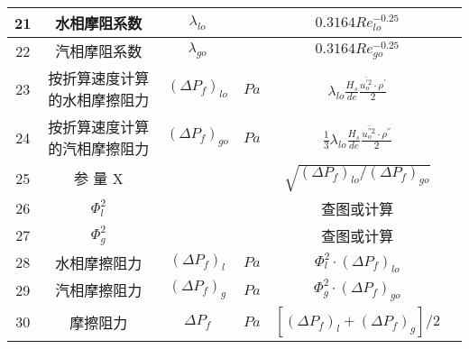 \begin{table}[H]
{\begin{tabular}{|c|c|c|c|c|c|}
            21   & 水相摩阻系数                 & $ \lambda_{lo} $          &            & $ 0.3164Re_{lo}^{-0.25} $                                                                     &      \\ \hline
            22   & 汽相摩阻系数                 & $ \lambda_{go} $          &            & $ 0.3164Re_{go}^{-0.25} $                                                                     &      \\ \hline
            23   & 按折算速度计算的水相摩擦阻力 & $ (\Delta P_f)_{lo} $     & $ Pa $     & $ \lambda_{lo} \frac{H_s}{de} \frac{\overline{u_{o}^{'2}} \cdot  \rho^{'}}{2} $               &      \\ \hline
            24   & 按折算速度计算的汽相摩擦阻力 & $ (\Delta P_f)_{go} $     & $ Pa $     & $ \frac{1}{3} \lambda_{lo} \frac{H_s}{de} \frac{\overline{u_{o}^{''2}} \cdot  \rho^{''}}{2} $ &      \\ \hline
            25   & 参 量 X                      &                           &            & $ \sqrt{(\Delta P_f)_{lo}/(\Delta P_f)_{go}} $                                                &      \\ \hline
            26   & $ \Phi_{l}^{2} $             &                           &            & 查图或计算                                                                                    &      \\ \hline
            27   & $ \Phi_{g}^{2} $             &                           &            & 查图或计算                                                                                    &      \\ \hline
            28   & 水相摩擦阻力                 & $ (\Delta P_f)_{l} $      & $ Pa $     & $ \Phi_{l}^{2} \cdot (\Delta P_f)_{lo} $                                                      &      \\ \hline
            29   & 汽相摩擦阻力                 & $ (\Delta P_f)_{g} $      & $ Pa $     & $ \Phi_{g}^{2} \cdot (\Delta P_f)_{go} $                                                      &      \\ \hline
            30   & 摩擦阻力                     & $ \Delta P_f $            & $ Pa $     & $ [(\Delta P_f)_{l}+(\Delta P_f)_{g}]/2 $                                                     &      \\ \hline
        \end{tabular}
    }
\end{table}

